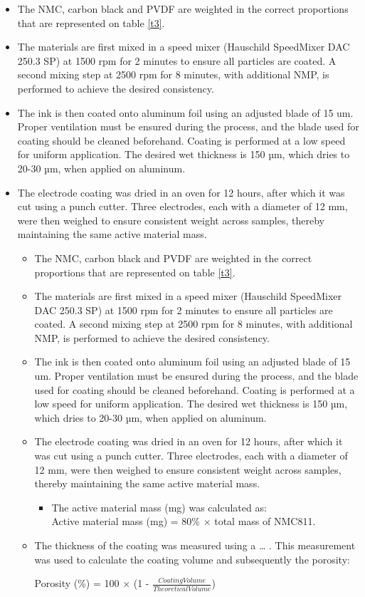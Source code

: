 \documentclass{article}
\begin{document}
\begin{itemize}
  \item The NMC, carbon black and PVDF are weighted in the correct proportions that are represented on 
  table \ref{t3}.
  \item The materials are first mixed in a speed mixer (Hauschild SpeedMixer DAC 250.3 SP)  at 1500 rpm for 2 minutes to ensure all particles are coated. A second mixing step at 2500 rpm for 8 minutes, with additional NMP, is performed to achieve the desired consistency.
  \item The ink is then coated onto aluminum foil using an adjusted blade of 15 um. Proper ventilation must be ensured during the process, and the blade used for coating should be cleaned beforehand. Coating is performed at a low speed for uniform application. The desired wet thickness is 150 µm, which dries to 20-30 µm, when applied on aluminum.
  \item The electrode coating was dried in an oven for 12 hours, after which it was cut using a punch cutter. Three electrodes, each with a diameter of 12 mm, were then weighed to ensure consistent weight across samples, thereby maintaining the same active material mass.
  \begin{itemize}
    \item The NMC, carbon black and PVDF are weighted in the correct proportions that are represented on 
    table \ref{t3}.
    \item The materials are first mixed in a speed mixer (Hauschild SpeedMixer DAC 250.3 SP)  at 1500 rpm for 2 minutes to ensure all particles are coated. A second mixing step at 2500 rpm for 8 minutes, with additional NMP, is performed to achieve the desired consistency.
    \item The ink is then coated onto aluminum foil using an adjusted blade of 15 um. Proper ventilation must be ensured during the process, and the blade used for coating should be cleaned beforehand. Coating is performed at a low speed for uniform application. The desired wet thickness is 150 µm, which dries to 20-30 µm, when applied on aluminum.
    \item The electrode coating was dried in an oven for 12 hours, after which it was cut using a punch cutter. Three electrodes, each with a diameter of 12 mm, were then weighed to ensure consistent weight across samples, thereby maintaining the same active material mass.
    \begin{itemize}
      \item The active material mass (mg) was calculated as:\\
       Active material mass (mg) =  80\% \(\times\) total mass of NMC811.
    \end{itemize}
    \item The thickness of the coating was measured using a … . This measurement was used to calculate the coating volume and subsequently the porosity:\\
    \begin{center}
    Porosity (\%) = 100 \(\times\) (1 - \(\frac{Coating Volume }{Theoretical Volume }\))\\
    

\end{center}
\end{itemize}
\end{itemize}
\end{document}
